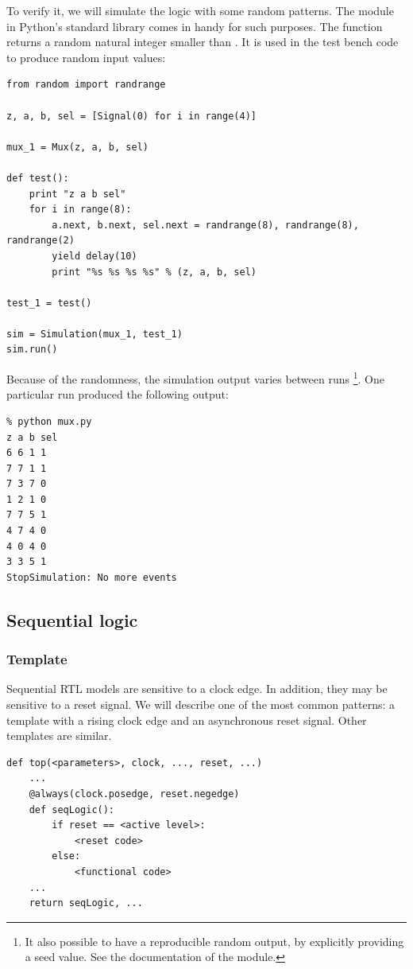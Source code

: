 To verify it, we will simulate the logic with some random patterns. The
 module in Python's standard library comes in handy for
such purposes. The function  returns a random
natural integer smaller than . It is used in the test bench
code to produce random input values:

\begin{verbatim}
from random import randrange

z, a, b, sel = [Signal(0) for i in range(4)]

mux_1 = Mux(z, a, b, sel)

def test():
    print "z a b sel"
    for i in range(8):
        a.next, b.next, sel.next = randrange(8), randrange(8), randrange(2)
        yield delay(10)
        print "%s %s %s %s" % (z, a, b, sel)

test_1 = test()

sim = Simulation(mux_1, test_1)
sim.run()    
\end{verbatim}

Because of the randomness, the simulation output varies between runs
\footnote{It also possible to have a reproducible random output, by
explicitly providing a seed value. See the documentation of the
 module.}. One particular run produced the following
output:

\begin{verbatim}
% python mux.py
z a b sel
6 6 1 1
7 7 1 1
7 3 7 0
1 2 1 0
7 7 5 1
4 7 4 0
4 0 4 0
3 3 5 1
StopSimulation: No more events
\end{verbatim}


\subsection{Sequential logic \label{model-seq}}

\subsubsection{Template \label{model-seq-templ}}
Sequential RTL models are sensitive to a clock edge. In addition, they
may be sensitive to a reset signal. We will describe one of the most
common patterns: a template with a rising clock edge and an
asynchronous reset signal. Other templates are similar.

\begin{verbatim}
def top(<parameters>, clock, ..., reset, ...)
    ...
    @always(clock.posedge, reset.negedge)
    def seqLogic():
        if reset == <active level>:
            <reset code>
        else:
            <functional code>
    ...
    return seqLogic, ...
\end{verbatim}


